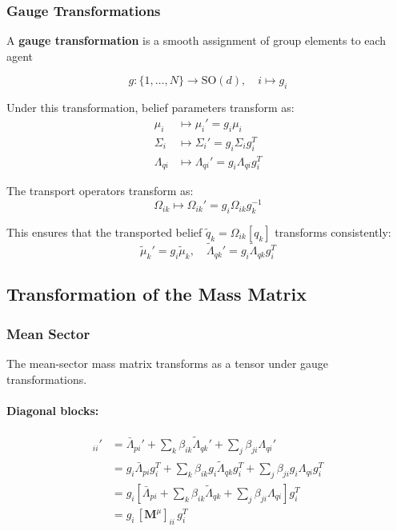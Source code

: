 \documentclass[12pt]{article}
\begin{document}
\subsubsection{Gauge Transformations}

A \textbf{gauge transformation} is a smooth assignment of group elements to each agent

\begin{equation}
g: \{1, \ldots, N\} \to \mathrm{SO}(d), \quad i \mapsto g_i
\end{equation}

Under this transformation, belief parameters transform as:
\begin{align}
\mu_i &\mapsto \mu_i' = g_i \mu_i \\
\Sigma_i &\mapsto \Sigma_i' = g_i \Sigma_i g_i^T \\
\Lambda_{qi} &\mapsto \Lambda_{qi}' = g_i \Lambda_{qi} g_i^T
\end{align}

The transport operators transform as:
\begin{equation}
\Omega_{ik} \mapsto \Omega_{ik}' = g_i \Omega_{ik} g_k^{-1}
\end{equation}

This ensures that the transported belief $\tilde{q}_k = \Omega_{ik}[q_k]$ transforms consistently:
\begin{equation}
\tilde{\mu}_k' = g_i \tilde{\mu}_k, \quad \tilde{\Lambda}_{qk}' = g_i \tilde{\Lambda}_{qk} g_i^T
\end{equation}

\subsection{Transformation of the Mass Matrix}

\subsubsection{Mean Sector}

The mean-sector mass matrix transforms as a tensor under gauge transformations.

\paragraph{Diagonal blocks:}
\begin{align}
[\mathbf{M}^\mu]_{ii}' &= \bar{\Lambda}_{pi}' + \sum_k \beta_{ik}\tilde{\Lambda}_{qk}' + \sum_j \beta_{ji}\Lambda_{qi}' \nonumber\\
&= g_i\bar{\Lambda}_{pi} g_i^T + \sum_k \beta_{ik} g_i\tilde{\Lambda}_{qk} g_i^T + \sum_j \beta_{ji} g_i\Lambda_{qi} g_i^T \nonumber\\
&= g_i \left[\bar{\Lambda}_{pi} + \sum_k \beta_{ik}\tilde{\Lambda}_{qk} + \sum_j \beta_{ji}\Lambda_{qi}\right] g_i^T \nonumber\\
&= g_i \, [\mathbf{M}^\mu]_{ii} \, g_i^T
\end{align}
\end{document}
